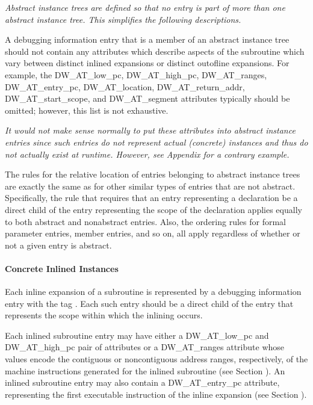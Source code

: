 \textit{Abstract instance trees are defined so that no entry is part
of more than one abstract instance tree. This simplifies the
following descriptions.}

A debugging information entry that is a member of an abstract
instance tree should not contain any attributes which describe
aspects of the subroutine which vary between distinct inlined
expansions or distinct out\dash of\dash line expansions. For example,
the DW\-\_AT\-\_low\-\_pc,
DW\-\_AT\-\_high\-\_pc, DW\-\_AT\-\_ranges, 
DW\-\_AT\-\_entry\-\_pc, DW\-\_AT\-\_location,
DW\-\_AT\-\_return\-\_addr, DW\-\_AT\-\_start\-\_scope, and 
DW\-\_AT\-\_segment
attributes typically should be omitted; however, this list
is not exhaustive.

\textit{It would not make sense normally to put these attributes into
abstract instance entries since such entries do not represent
actual (concrete) instances and thus do not actually exist at
run\dash time.  However, 
see Appendix  
for a contrary example.}

The rules for the relative location of entries belonging to
abstract instance trees are exactly the same as for other
similar types of entries that are not abstract. Specifically,
the rule that requires that an entry representing a declaration
be a direct child of the entry representing the scope of the
declaration applies equally to both abstract and non\dash abstract
entries. Also, the ordering rules for formal parameter entries,
member entries, and so on, all apply regardless of whether
or not a given entry is abstract.

\paragraph{Concrete Inlined Instances}
\label{chap:concreteinlinedinstances}

Each inline expansion of a subroutine is represented
by a debugging information entry with the 
tag . 
Each such entry should be a direct
child of the entry that represents the scope within which
the inlining occurs.

Each inlined subroutine entry may have either a DW\_AT\_low\_pc
and DW\_AT\_high\_pc pair of attributes or a DW\_AT\_ranges
attribute whose values encode the contiguous or non\dash contiguous
address ranges, respectively, of the machine instructions
generated for the inlined subroutine (see 
Section ). An
inlined subroutine entry may also contain a DW\_AT\_entry\_pc
attribute, representing the first executable instruction of
the inline expansion (see 
Section ).

